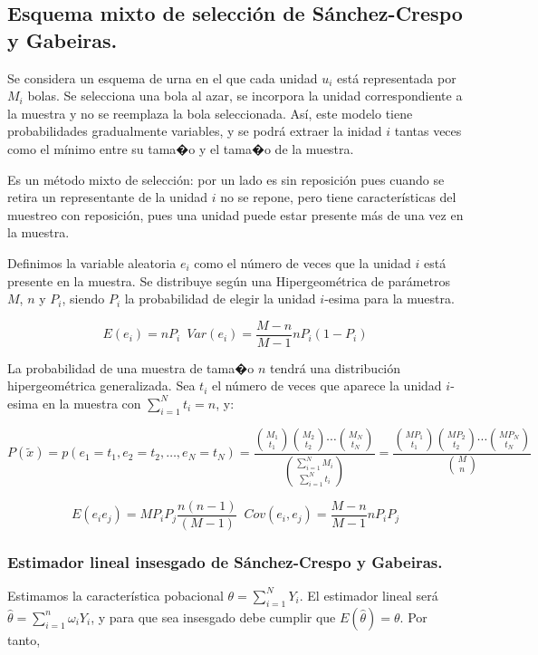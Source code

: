 \subsection{Esquema mixto de selecci\'on de S\'anchez-Crespo y Gabeiras.}

Se considera un esquema de urna en el que cada unidad $u_{i}$ est\'a
representada por $M_{i}$ bolas. Se selecciona una bola al azar, se
incorpora la unidad correspondiente a la muestra y no se reemplaza
la bola seleccionada. As\'i, este modelo tiene probabilidades gradualmente
variables, y se podr\'a extraer la inidad $i$ tantas veces como el
m\'inimo entre su tama�o y el tama�o de la muestra.

Es un m\'etodo mixto de selecci\'on: por un lado es sin reposici\'on pues
cuando se retira un representante de la unidad $i$ no se repone,
pero tiene caracter\'isticas del muestreo con reposici\'on, pues una unidad
puede estar presente m\'as de una vez en la muestra.

Definimos la variable aleatoria $e_{i}$ como el n\'umero de veces que
la unidad $i$ est\'a presente en la muestra. Se distribuye seg\'un una
Hipergeom\'etrica de par\'ametros $M$, $n$ y $P_{i}$, siendo $P_{i}$
la probabilidad de elegir la unidad $i$-esima para la muestra.

\[
E\left(e_{i}\right)=nP_{i}\,\,\,Var\left(e_{i}\right)=\dfrac{M-n}{M-1}nP_{i}\left(1-P_{i}\right)
\]


La probabilidad de una muestra de tama�o $n$ tendr\'a una distribuci\'on
hipergeom\'etrica generalizada. Sea $t_{i}$ el n\'umero de veces que
aparece la unidad $i$-esima en la muestra con $\sum_{i=1}^{N}t_{i}=n$,
y:

\[
P\left(\tilde{x}\right)=p\left(e_{1}=t_{1},e_{2}=t_{2},\ldots,e_{N}=t_{N}\right)=\dfrac{\binom{M_{1}}{t_{1}}\binom{M_{2}}{t_{2}}\cdots\binom{M_{N}}{t_{N}}}{\binom{\sum_{i=1}^{N}M_{i}}{\sum_{i=1}^{N}t_{i}}}=\dfrac{\binom{MP_{1}}{t_{1}}\binom{MP_{2}}{t_{2}}\cdots\binom{MP_{N}}{t_{N}}}{\binom{M}{n}}
\]


\[
E\left(e_{i}e_{j}\right)=MP_{i}P_{j}\dfrac{n\left(n-1\right)}{\left(M-1\right)}\,\,\,Cov\left(e_{i},e_{j}\right)=\dfrac{M-n}{M-1}nP_{i}P_{j}
\]



\subsubsection{Estimador lineal insesgado de S\'anchez-Crespo y Gabeiras.}

Estimamos la caracter\'istica pobacional $\theta=\sum_{i=1}^{N}Y_{i}$.
El estimador lineal ser\'a $\hat{\theta}=\sum_{i=1}^{n}\omega_{i}Y_{i}$,
y para que sea insesgado debe cumplir que $E\left(\hat{\theta}\right)=\theta$.
Por tanto,


